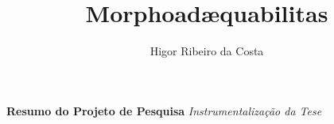 \documentclass[]{report}
\title{Morphoadæquabilitas}
\author{Higor Ribeiro da Costa}
\begin{document}

    \textbf{Resumo do Projeto de Pesquisa}
    \textit{Instrumentalização da Tese}

    
\end{document}
